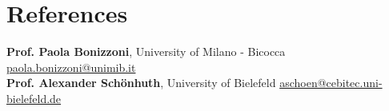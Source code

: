 \documentclass[letterpaper,11pt]{article}
\begin{document}
\section{References}
 \begin{itemize}[leftmargin=0.15in, label={}]
    \small{\item{
     \textbf{Prof. Paola Bonizzoni}{, University of Milano - Bicocca \hfill \href{mailto:paola.bonizzoni@unimib.it}{paola.bonizzoni@unimib.it}}\\
     \textbf{Prof. Alexander Sch\"{o}nhuth}{, University of Bielefeld \hfill \href{mailto:aschoen@cebitec.uni-bielefeld.de}{aschoen@cebitec.uni-bielefeld.de}}
    }}
 \end{itemize}
 
\end{document}
